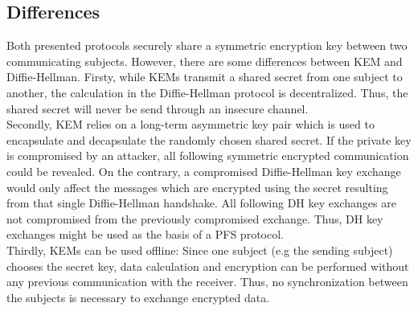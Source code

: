 \subsection{Differences}
Both presented protocols securely share a symmetric encryption key between two communicating subjects. However, there are some differences between \gls{KEM} and Diffie-Hellman. Firsty, while \glspl{KEM} transmit a shared secret from one subject to another, the calculation in the Diffie-Hellman protocol is decentralized. Thus, the shared secret will never be send through an insecure channel.\\
Secondly, \gls{KEM} relies on a long-term asymmetric key pair which is used to encapsulate and decapsulate the randomly chosen shared secret. If the private key is compromised by an attacker, all following symmetric encrypted communication could be revealed. On the contrary, a compromised Diffie-Hellman key exchange would only affect the messages which are encrypted using the secret resulting from that single Diffie-Hellman handshake. All following \gls{DH} key exchanges are not compromised from the previously compromised exchange. Thus, \gls{DH} key exchanges might be used as the basis of a \gls{PFS} protocol.\\
Thirdly, KEMs can be used offline: Since one subject (e.g the sending subject) chooses the secret key, data calculation and encryption can be performed without any previous communication with the receiver. Thus, no synchronization between the subjects is necessary to exchange encrypted data.

